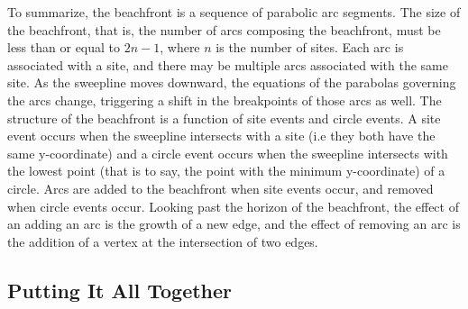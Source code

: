 \documentclass[12pt,twoside]{reedthesis}
\begin{document}
        To summarize, the beachfront is a sequence of parabolic arc segments. The size of the beachfront, that is, the number of arcs composing the beachfront, must be less than or equal to $2n-1$, where $n$ is the number of sites. Each arc is associated with a site, and there may be multiple arcs associated with the same site. As the sweepline moves downward, the equations of the parabolas governing the arcs change, triggering a shift in the breakpoints of those arcs as well. The structure of the beachfront is a function of site events and circle events. A site event occurs when the sweepline intersects with a site (i.e they both have the same y-coordinate) and a circle event occurs when the sweepline intersects with the lowest point (that is to say, the point with the minimum y-coordinate) of a circle. Arcs are added to the beachfront when site events occur, and removed when circle events occur. Looking past the horizon of the beachfront, the effect of an adding an arc is the growth of a new edge, and the effect of removing an arc is the addition of a vertex at the intersection of two edges.\par





    \subsection{Putting It All Together} %
    \label{sub:putting_it_all_together}
\end{document}
